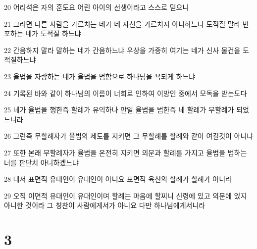 \par 20 어리석은 자의 훈도요 어린 아이의 선생이라고 스스로 믿으니
\par 21 그러면 다른 사람을 가르치는 네가 네 자신을 가르치지 아니하느냐 도적질 말라 반포하는 네가 도적질 하느냐
\par 22 간음하지 말라 말하는 네가 간음하느냐 우상을 가증히 여기는 네가 신사 물건을 도적질하느냐
\par 23 율법을 자랑하는 네가 율법을 범함으로 하나님을 욕되게 하느냐
\par 24 기록된 바와 같이 하나님의 이름이 너희로 인하여 이방인 중에서 모독을 받는도다
\par 25 네가 율법을 행한즉 할례가 유익하나 만일 율법을 범한즉 네 할례가 무할례가 되었느니라
\par 26 그런즉 무할례자가 율법의 제도를 지키면 그 무할례를 할례와 같이 여길것이 아니냐
\par 27 또한 본래 무할례자가 율법을 온전히 지키면 의문과 할례를 가지고 율법을 범하는 너를 판단치 아니하겠느냐
\par 28 대저 표면적 유대인이 유대인이 아니요 표면적 육신의 할례가 할례가 아니라
\par 29 오직 이면적 유대인이 유대인이며 할례는 마음에 할찌니 신령에 있고 의문에 있지 아니한 것이라 그 칭찬이 사람에게서가 아니요 다만 하나님에게서니라

\chapter{3}

